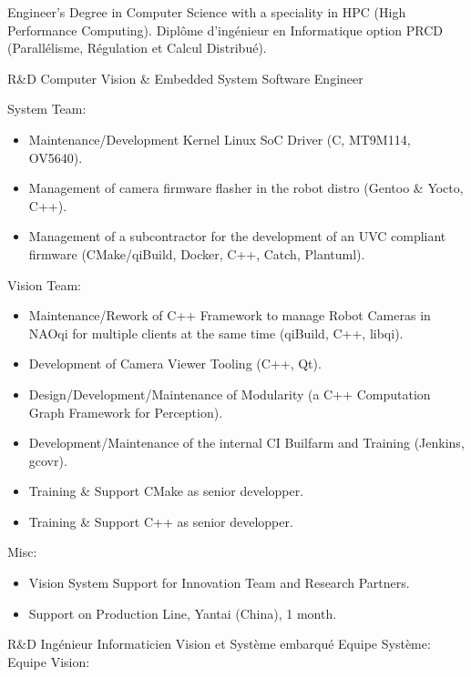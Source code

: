 \documentclass{article}
\begin{document}

\begin{llist}
 
{
Engineer's Degree in Computer Science with a speciality in HPC (High Performance Computing).
}
{
Dipl\^{o}me d'ing\'{e}nieur en Informatique option PRCD (Parall\'{e}lisme,
R\'{e}gulation et Calcul Distribu\'{e}).
}

{}
{}
\vspace{-0.33cm}

 {
R\&D Computer Vision \& Embedded System Software Engineer\\
\vspace{-0.33cm}

System Team:
\begin{itemize}
\item Maintenance/Development Kernel Linux SoC Driver (C, MT9M114, OV5640).
\item Management of camera firmware flasher in the robot distro (Gentoo \& Yocto, C++).
\item Management of a subcontractor for the development of an UVC compliant firmware (CMake/qiBuild, Docker, C++, Catch, Plantuml).
\end{itemize}
Vision Team:
\begin{itemize}
\item Maintenance/Rework of C++ Framework to manage Robot Cameras in NAOqi for multiple clients at the same time (qiBuild, C++, libqi).
\item Development of Camera Viewer Tooling (C++, Qt).
\item Design/Development/Maintenance of Modularity (a C++ Computation Graph Framework for Perception).
\item Development/Maintenance of the internal CI Builfarm and Training (Jenkins,
 gcovr).
\item Training \& Support CMake as senior developper.
\item Training \& Support C++ as senior developper.
\end{itemize}
Misc:
\begin{itemize}
\item Vision System Support for Innovation Team and Research Partners.
\item Support on Production Line, Yantai (China), 1 month.
\end{itemize}
}{
R\&D Ing\'{e}nieur Informaticien Vision et Syst\`{e}me embarqu\'{e}
\vspace{-0.33cm}
Equipe Syst\`{e}me:
Equipe Vision:
}


\end{llist}
\end{document}
